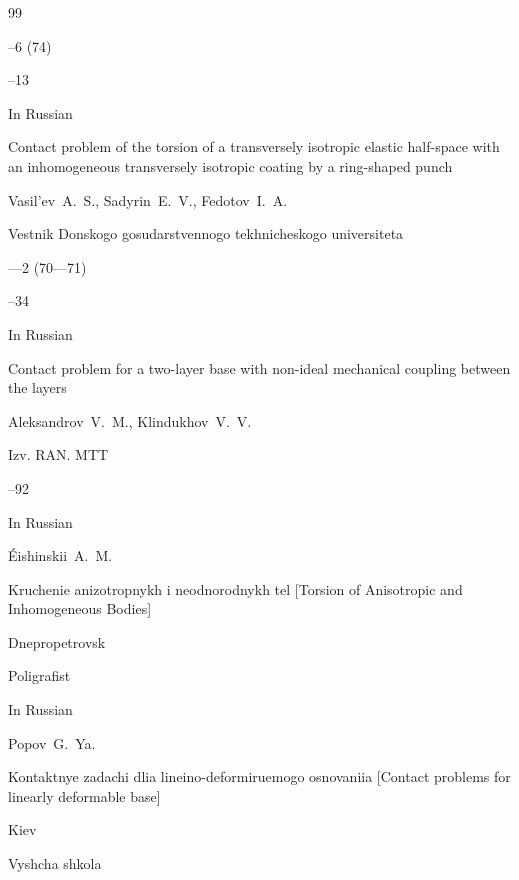 \begin{thebibliography}{99}


--6 (74) 

--13







\lang In Russian

\paper Contact problem of the torsion of a transversely isotropic elastic half-space with an inhomogeneous transversely isotropic coating by  a ring-shaped punch

\by Vasil'ev~A.~S., Sadyrin~E.~V., Fedotov~I.~A.

\jour Vestnik Donskogo gosudarstvennogo tekhnicheskogo universiteta


—2 (70—71)

--34








\lang In Russian

\paper Contact problem for a two-layer base with non-ideal mechanical coupling between the layers

\by Aleksandrov~V.~M., Klindukhov~V.~V. 

\jour Izv. RAN. MTT



--92




\lang In Russian

\by \'Eishinskii~A.~M. 

\book Kruchenie anizotropnykh i neodnorodnykh tel \rm [Torsion of Anisotropic and Inhomogeneous Bodies]

\publaddr Dnepropetrovsk 

\publ Poligrafist 








\lang In Russian

\by Popov~G.~Ya. 

\book Kontaktnye zadachi dlia lineino-deformiruemogo osnovaniia \rm [Contact problems for linearly deformable base]

\publaddr Kiev

\publ Vyshcha shkola







\end{thebibliography}



\EngDate



\newpage \Russian



%

%

